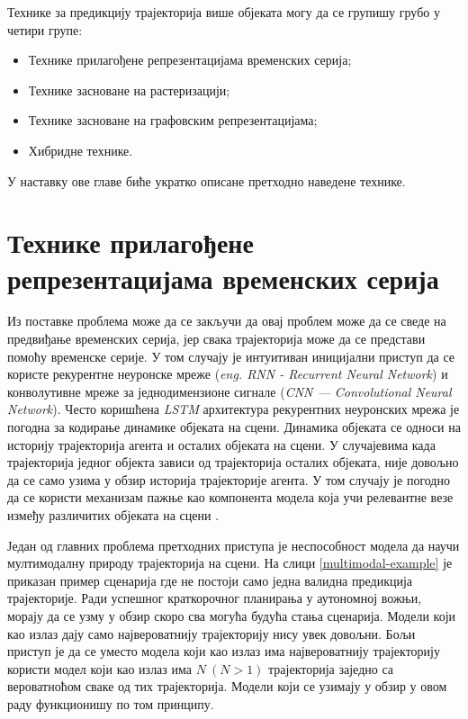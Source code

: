 \documentclass[11pt,oneside]{memoir}
\begin{document}
Технике за предикцију трајекторија више објеката могу да се групишу грубо у четири групе:
\begin{itemize}
  \item Технике прилагођене репрезентацијама временских серија;
  \item Технике засноване на растеризацији;
  \item Технике засноване на графовским репрезентацијама;
  \item Хибридне технике.
\end{itemize}

У наставку ове главе биће укратко описане претходно наведене технике.

\section{Технике прилагођене репрезентацијама временских серија}

Из поставке проблема може да се закључи да овај проблем може да се сведе на предвиђање временских серија, јер свака 
трајекторија може да се представи помоћу временске серије. У том случају је интуитиван иницијални приступ да се користе рекурентне неуронске мреже
(\textit{eng. RNN - Recurrent Neural Network}) и конволутивне мреже за једнодимензионе сигнале (\textit{CNN --- Convolutional Neural Network}). 
Често коришћена \textit{LSTM} архитектура рекурентних неуронских мрежа је погодна за кодирање динамике објеката на сцени. 
Динамика објеката се односи на историју трајекторија агента и осталих објеката на сцени.
У случајевима када трајекторија једног објекта зависи од трајекторија осталих објеката, није довољно да се само узима у обзир
историја трајекторије агента. У том случају је погодно да се користи механизам пажње као компонента модела која учи 
релевантне везе између различитих објеката на сцени \cite{argoverse, social_lstm, attention_is_all_you_need}. 

Један од главних проблема претходних приступа је неспособност модела да научи мултимодалну природу трајекторија на сцени. На слици
\ref{multimodal-example} је приказан пример сценарија где не постоји само једна валидна предикција трајекторије.
Ради успешног краткорочног планирања у аутономној вожњи, морају да се узму у обзир скоро сва могућа будућа стања сценарија. Модели
који као излаз дају само највероватнију трајекторију нису увек довољни. Бољи приступ је да се уместо модела који као излаз има највероватнију трајекторију користи
модел који као излаз има $N\ (N > 1)$ трајекторија заједно са вероватноћом сваке од тих трајекторија. Модели који се узимају у обзир у овом раду функционишу
по том принципу.
\end{document}
